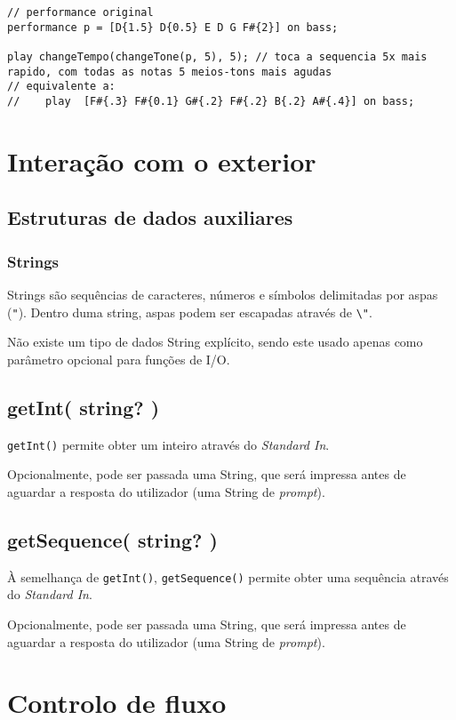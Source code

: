 \documentclass{article}
\begin{document}
\begin{lstlisting} 
// performance original
performance p = [D{1.5} D{0.5} E D G F#{2}] on bass;

play changeTempo(changeTone(p, 5), 5); // toca a sequencia 5x mais rapido, com todas as notas 5 meios-tons mais agudas
// equivalente a:
//    play  [F#{.3} F#{0.1} G#{.2} F#{.2} B{.2} A#{.4}] on bass;
\end{lstlisting}

\section{Interação com o exterior} \label{exterior}
\subsection{Estruturas de dados auxiliares}
\subsubsection{Strings}
Strings são sequências de caracteres, números e símbolos delimitadas por aspas (\texttt{"}). Dentro duma string, aspas podem ser escapadas através de \texttt{\textbackslash"}.

Não existe um tipo de dados String explícito, sendo este usado apenas como parâmetro opcional para funções de I/O.
\subsection{getInt( string? )}
\texttt{getInt()} permite obter um inteiro através do \textit{Standard In}. 

Opcionalmente, pode ser passada uma String, que será impressa antes de aguardar a resposta do utilizador (uma String de \textit{prompt}).

\subsection{getSequence( string? )}
À semelhança de \texttt{getInt()}, \texttt{getSequence()} permite obter uma sequência através do \textit{Standard In}.

Opcionalmente, pode ser passada uma String, que será impressa antes de aguardar a resposta do utilizador (uma String de \textit{prompt}).


\section{Controlo de fluxo} \label{flux}
\end{document}
